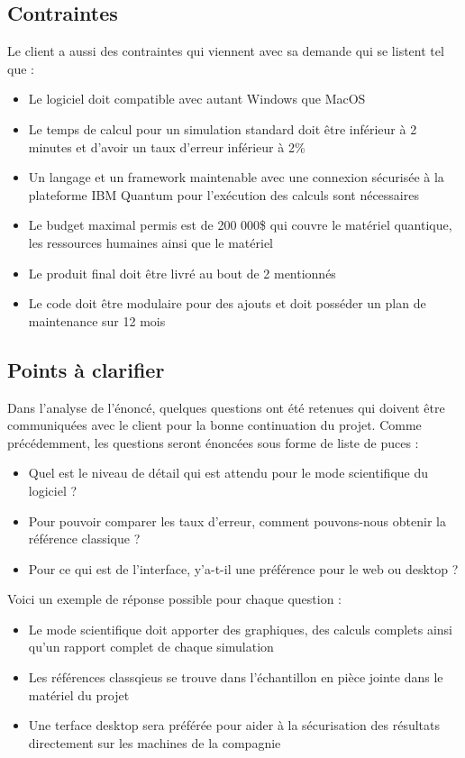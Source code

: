 \documentclass[11pt]{article}
\begin{document}
\subsection{Contraintes}
Le client a aussi des contraintes qui viennent avec sa demande qui se listent tel que :

\begin{itemize}
  \item Le logiciel doit compatible avec autant Windows que MacOS
  \item Le temps de calcul pour un simulation standard doit être inférieur à 2 minutes et d'avoir un taux d'erreur inférieur à 2\%
  \item Un langage et un framework maintenable avec une connexion sécurisée à la plateforme IBM Quantum pour l’exécution des calculs sont nécessaires
  \item Le budget maximal permis est de 200 000\$ qui couvre le matériel quantique, les ressources humaines ainsi que le matériel
  \item Le produit final doit être livré au bout de 2 mentionnés
  \item Le code doit être modulaire pour des ajouts et doit posséder un plan de maintenance sur 12 mois
\end{itemize}

\subsection{Points à clarifier}
Dans l'analyse de l'énoncé, quelques questions ont été retenues qui doivent être communiquées avec le client pour la bonne continuation du projet. Comme précédemment, les questions seront énoncées sous forme de liste de puces :

\begin{itemize}
  \item Quel est le niveau de détail qui est attendu pour le mode scientifique du logiciel ?
  \item Pour pouvoir comparer les taux d'erreur, comment pouvons-nous obtenir la référence classique ?
  \item Pour ce qui est de l'interface, y'a-t-il une préférence pour le web ou desktop ?
\end{itemize}
Voici un exemple de réponse possible pour chaque question :

\begin{itemize}
  \item Le mode scientifique doit apporter des graphiques, des calculs complets ainsi qu'un rapport complet de chaque simulation
  \item Les références classqieus se trouve dans l'échantillon en pièce jointe dans le matériel du projet
  \item Une terface desktop sera préférée pour aider à la sécurisation des résultats directement sur les machines de la compagnie
\end{itemize}
\end{document}
